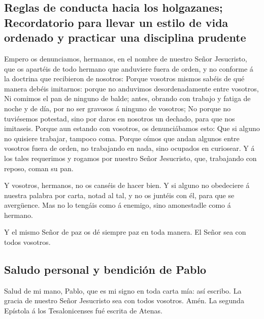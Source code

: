 \hypertarget{reglas-de-conducta-hacia-los-holgazanes-recordatorio-para-llevar-un-estilo-de-vida-ordenado-y-practicar-una-disciplina-prudente}{%
\subsection{Reglas de conducta hacia los holgazanes; Recordatorio para
llevar un estilo de vida ordenado y practicar una disciplina
prudente}\label{reglas-de-conducta-hacia-los-holgazanes-recordatorio-para-llevar-un-estilo-de-vida-ordenado-y-practicar-una-disciplina-prudente}}

 Empero os denunciamos, hermanos, en el nombre de nuestro
Señor Jesucristo, que os apartéis de todo hermano que anduviere fuera de
orden, y no conforme á la doctrina que recibieron de nosotros:
 Porque vosotros mismos sabéis de qué manera debéis
imitarnos: porque no anduvimos desordenadamente entre vosotros,
 Ni comimos el pan de ninguno de balde; antes, obrando con
trabajo y fatiga de noche y de día, por no ser gravosos á ninguno de
vosotros;  No porque no tuviésemos potestad, sino por daros
en nosotros un dechado, para que nos imitaseis.  Porque aun
estando con vosotros, os denunciábamos esto: Que si alguno no quisiere
trabajar, tampoco coma.  Porque oímos que andan algunos
entre vosotros fuera de orden, no trabajando en nada, sino ocupados en
curiosear.  Y á los tales requerimos y rogamos por nuestro
Señor Jesucristo, que, trabajando con reposo, coman su pan.

 Y vosotros, hermanos, no os canséis de hacer bien.
 Y si alguno no obedeciere á nuestra palabra por carta,
notad al tal, y no os juntéis con él, para que se avergüence.
 Mas no lo tengáis como á enemigo, sino amonestadle como á
hermano.

 Y el mismo Señor de paz os dé siempre paz en toda manera.
El Señor sea con todos vosotros.

\hypertarget{saludo-personal-y-bendiciuxf3n-de-pablo}{%
\subsection{Saludo personal y bendición de
Pablo}\label{saludo-personal-y-bendiciuxf3n-de-pablo}}

 Salud de mi mano, Pablo, que es mi signo en toda carta
mía: así escribo.  La gracia de nuestro Señor Jesucristo
sea con todos vosotros. Amén. La segunda Epístola á los Tesalonicenses
fué escrita de Atenas.
